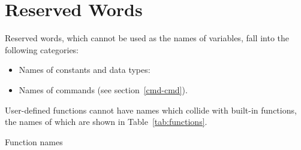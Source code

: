 \chapter{Reserved Words}
\label{reswords}

Reserved words, which cannot be used as the names of variables, fall
into the following categories:

\begin{itemize}
\item Names of constants and data types:
  
  
\item Names of  commands (see section~\ref{cmd-cmd}).
\end{itemize}

User-defined functions cannot have names which collide with built-in
functions, the names of which are shown in Table~\ref{tab:functions}.

\begin{table}[htbp]
\caption{Function names}
\label{tab:functions}
\begin{center}

\end{center}
\end{table}

